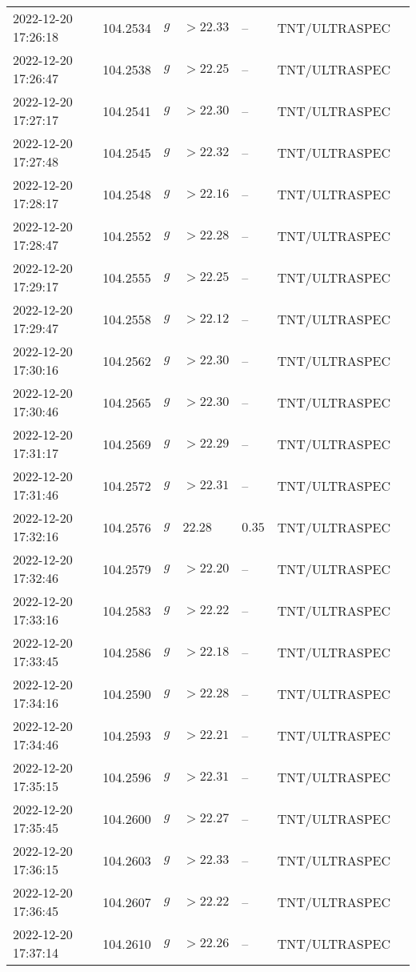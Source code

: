 \documentclass{nature_plusfigure}
\begin{document}
\begin{supplement}
\begin{center}
\begin{longtable}{lllllll}
2022-12-20 17:26:18 & 104.2534 & $g$ & $>22.33$ & -- & TNT/ULTRASPEC &  \\ 
2022-12-20 17:26:47 & 104.2538 & $g$ & $>22.25$ & -- & TNT/ULTRASPEC &  \\ 
2022-12-20 17:27:17 & 104.2541 & $g$ & $>22.30$ & -- & TNT/ULTRASPEC &  \\ 
2022-12-20 17:27:48 & 104.2545 & $g$ & $>22.32$ & -- & TNT/ULTRASPEC &  \\ 
2022-12-20 17:28:17 & 104.2548 & $g$ & $>22.16$ & -- & TNT/ULTRASPEC &  \\ 
2022-12-20 17:28:47 & 104.2552 & $g$ & $>22.28$ & -- & TNT/ULTRASPEC &  \\ 
2022-12-20 17:29:17 & 104.2555 & $g$ & $>22.25$ & -- & TNT/ULTRASPEC &  \\ 
2022-12-20 17:29:47 & 104.2558 & $g$ & $>22.12$ & -- & TNT/ULTRASPEC &  \\ 
2022-12-20 17:30:16 & 104.2562 & $g$ & $>22.30$ & -- & TNT/ULTRASPEC &  \\ 
2022-12-20 17:30:46 & 104.2565 & $g$ & $>22.30$ & -- & TNT/ULTRASPEC &  \\ 
2022-12-20 17:31:17 & 104.2569 & $g$ & $>22.29$ & -- & TNT/ULTRASPEC &  \\ 
2022-12-20 17:31:46 & 104.2572 & $g$ & $>22.31$ & -- & TNT/ULTRASPEC &  \\ 
2022-12-20 17:32:16 & 104.2576 & $g$ & $22.28$ & $0.35$ & TNT/ULTRASPEC &  \\ 
2022-12-20 17:32:46 & 104.2579 & $g$ & $>22.20$ & -- & TNT/ULTRASPEC &  \\ 
2022-12-20 17:33:16 & 104.2583 & $g$ & $>22.22$ & -- & TNT/ULTRASPEC &  \\ 
2022-12-20 17:33:45 & 104.2586 & $g$ & $>22.18$ & -- & TNT/ULTRASPEC &  \\ 
2022-12-20 17:34:16 & 104.2590 & $g$ & $>22.28$ & -- & TNT/ULTRASPEC &  \\ 
2022-12-20 17:34:46 & 104.2593 & $g$ & $>22.21$ & -- & TNT/ULTRASPEC &  \\ 
2022-12-20 17:35:15 & 104.2596 & $g$ & $>22.31$ & -- & TNT/ULTRASPEC &  \\ 
2022-12-20 17:35:45 & 104.2600 & $g$ & $>22.27$ & -- & TNT/ULTRASPEC &  \\ 
2022-12-20 17:36:15 & 104.2603 & $g$ & $>22.33$ & -- & TNT/ULTRASPEC &  \\ 
2022-12-20 17:36:45 & 104.2607 & $g$ & $>22.22$ & -- & TNT/ULTRASPEC &  \\ 
2022-12-20 17:37:14 & 104.2610 & $g$ & $>22.26$ & -- & TNT/ULTRASPEC &  \\ 

\end{longtable}
\end{center}
\end{supplement}
\end{document}
